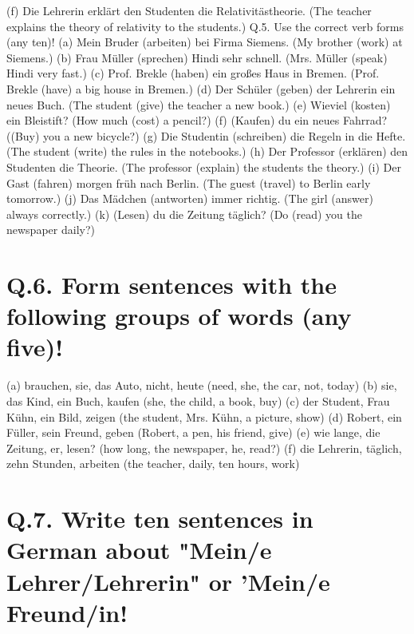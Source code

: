 \documentclass{article}
\begin{document}
(f) Die Lehrerin erklärt den Studenten die Relativitästheorie. (The teacher explains the theory of relativity to the students.)
Q.5. Use the correct verb forms (any ten)!
(a) Mein Bruder (arbeiten) bei Firma Siemens. (My brother (work) at Siemens.)
(b) Frau Müller (sprechen) Hindi sehr schnell. (Mrs. Müller (speak) Hindi very fast.)
(c) Prof. Brekle (haben) ein großes Haus in Bremen. (Prof. Brekle (have) a big house in Bremen.)
(d) Der Schüler (geben) der Lehrerin ein neues Buch. (The student (give) the teacher a new book.)
(e) Wieviel (kosten) ein Bleistift? (How much (cost) a pencil?)
(f) (Kaufen) du ein neues Fahrrad? ((Buy) you a new bicycle?)
(g) Die Studentin (schreiben) die Regeln in die Hefte. (The student (write) the rules in the notebooks.)
(h) Der Professor (erklären) den Studenten die Theorie. (The professor (explain) the students the theory.)
(i) Der Gast (fahren) morgen früh nach Berlin. (The guest (travel) to Berlin early tomorrow.)
(j) Das Mädchen (antworten) immer richtig. (The girl (answer) always correctly.)
(k) (Lesen) du die Zeitung täglich? (Do (read) you the newspaper daily?)

\section*{Q.6. Form sentences with the following groups of words (any five)!}
(a) brauchen, sie, das Auto, nicht, heute (need, she, the car, not, today)
(b) sie, das Kind, ein Buch, kaufen (she, the child, a book, buy)
(c) der Student, Frau Kühn, ein Bild, zeigen (the student, Mrs. Kühn, a picture, show)
(d) Robert, ein Füller, sein Freund, geben (Robert, a pen, his friend, give)
(e) wie lange, die Zeitung, er, lesen? (how long, the newspaper, he, read?)
(f) die Lehrerin, täglich, zehn Stunden, arbeiten (the teacher, daily, ten hours, work)

\section*{Q.7. Write ten sentences in German about "Mein/e Lehrer/Lehrerin" or 'Mein/e Freund/in!}
\end{document}
